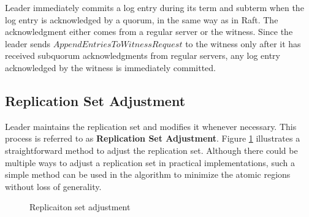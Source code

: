 Leader immediately commits a log entry during its term and subterm when the log entry is acknowledged by a quorum, in the same way as in Raft. The acknowledgment either comes from a regular server or the witness. Since the leader sends $AppendEntriesToWitnessRequest$ to the witness only after it has received subquorum acknowledgments from regular servers, any log entry acknowledged by the witness is immediately committed.

\subsection{Replication Set Adjustment} \label{subsection:replication-set-adjustment}
Leader maintains the replication set and modifies it whenever necessary. This process is referred to as \textbf{Replication Set Adjustment}. Figure \ref{fig:adjust-replicaitonset} illustrates a straightforward method to adjust the replication set. Although there could be multiple ways to adjust a replication set in practical implementations, such a simple method can be used in the algorithm to minimize the atomic regions without loss of generality.
\begin{figure}
    \begin{framed}
        
    \end{framed}
    \caption{Replicaiton set adjustment}
    \label{fig:adjust-replicaitonset}
\end{figure}

